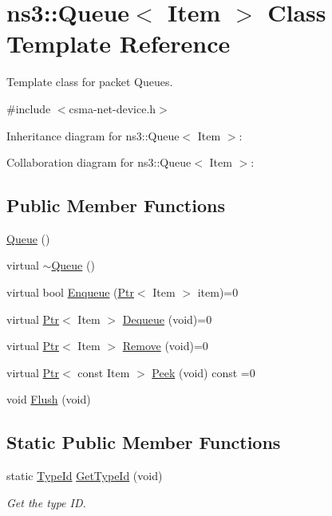 \hypertarget{classns3_1_1Queue}{}\section{ns3\+:\+:Queue$<$ Item $>$ Class Template Reference}
\label{classns3_1_1Queue}


Template class for packet Queues.  




{\ttfamily \#include $<$csma-\/net-\/device.\+h$>$}



Inheritance diagram for ns3\+:\+:Queue$<$ Item $>$\+:


Collaboration diagram for ns3\+:\+:Queue$<$ Item $>$\+:
\subsection*{Public Member Functions}
\begin{DoxyCompactItemize}
\item 
\hyperlink{classns3_1_1Queue_ab93c96716f7a89d4afdfa5751e542ffa}{Queue} ()
\item 
virtual \hyperlink{classns3_1_1Queue_af9730c1deadbd289ceb0a59956a40f41}{$\sim$\+Queue} ()
\item 
virtual bool \hyperlink{classns3_1_1Queue_adb0a0fa921500253f8bb60f7ca819c5e}{Enqueue} (\hyperlink{classns3_1_1Ptr}{Ptr}$<$ Item $>$ item)=0
\item 
virtual \hyperlink{classns3_1_1Ptr}{Ptr}$<$ Item $>$ \hyperlink{classns3_1_1Queue_a9cf7af155b96b1b59f1a61d77680176a}{Dequeue} (void)=0
\item 
virtual \hyperlink{classns3_1_1Ptr}{Ptr}$<$ Item $>$ \hyperlink{classns3_1_1Queue_a4c9b65890dff0ff3d3dcae12a8dfccec}{Remove} (void)=0
\item 
virtual \hyperlink{classns3_1_1Ptr}{Ptr}$<$ const Item $>$ \hyperlink{classns3_1_1Queue_a8cfd906d4e0d7090cf7bc1d3437265fe}{Peek} (void) const =0
\item 
void \hyperlink{classns3_1_1Queue_a0b912cf4d17d812887db7460547bebdf}{Flush} (void)
\end{DoxyCompactItemize}
\subsection*{Static Public Member Functions}
\begin{DoxyCompactItemize}
\item 
static \hyperlink{classns3_1_1TypeId}{Type\+Id} \hyperlink{classns3_1_1Queue_af1cd6a86d4d571bbfa08b65adb0cbf7a}{Get\+Type\+Id} (void)
\begin{DoxyCompactList}\small\item\em Get the type ID. \end{DoxyCompactList}\end{DoxyCompactItemize}
